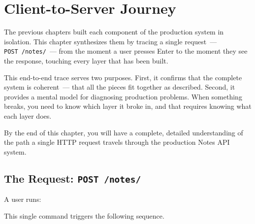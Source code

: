 \setcounter{chapter}{28}
\chapter{Client-to-Server Journey}\label{ch:29-client-server-journey}

\chapterrule

The previous chapters built each component of the production system in isolation. This chapter synthesizes them by tracing a single request~--- \texttt{POST\ /notes/}~--- from the moment a user presses Enter to the moment they see the response, touching every layer that has been built.

This end-to-end trace serves two purposes. First, it confirms that the complete system is coherent~--- that all the pieces fit together as described. Second, it provides a mental model for diagnosing production problems. When something breaks, you need to know which layer it broke in, and that requires knowing what each layer does.

By the end of this chapter, you will have a complete, detailed understanding of the path a single HTTP request travels through the production Notes API system.

\setcounter{section}{0}
\section{\texorpdfstring{The Request: \texttt{POST\ /notes/}}{The Request: POST /notes/}}\label{29-client-server-journey:291-the-request-post-notes}

A user runs:

\begin{codebox}[short]

\begin{Shaded}
\begin{Highlighting}[]
 \DataTypeTok{\textbackslash{}}
    \DataTypeTok{\textbackslash{}}
   
\end{Highlighting}
\end{Shaded}

\end{codebox}

\noindent{}This single command triggers the following sequence.

\setcounter{section}{1}
